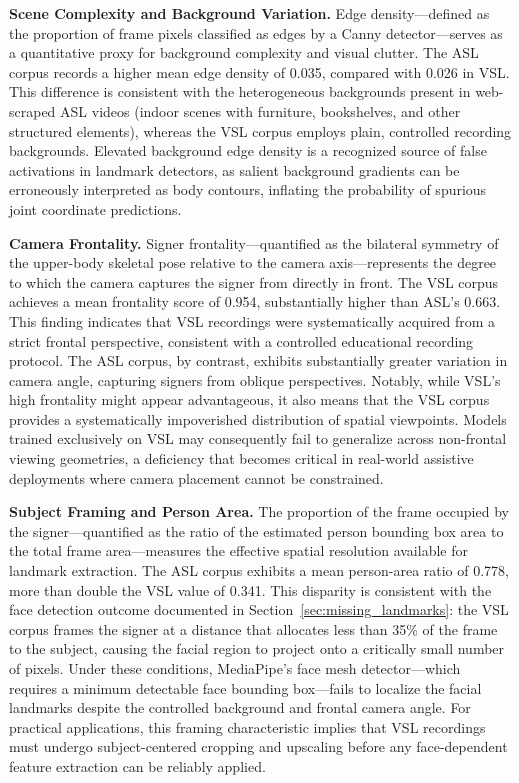 \documentclass{ieeeaccess}
\begin{document}
\textbf{Scene Complexity and Background Variation.} Edge density—defined as the proportion of frame pixels classified as edges by a Canny detector—serves as a quantitative proxy for background complexity and visual clutter. The ASL corpus records a higher mean edge density of 0.035, compared with 0.026 in VSL. This difference is consistent with the heterogeneous backgrounds present in web-scraped ASL videos (indoor scenes with furniture, bookshelves, and other structured elements), whereas the VSL corpus employs plain, controlled recording backgrounds. Elevated background edge density is a recognized source of false activations in landmark detectors, as salient background gradients can be erroneously interpreted as body contours, inflating the probability of spurious joint coordinate predictions.

\textbf{Camera Frontality.} Signer frontality—quantified as the bilateral symmetry of the upper-body skeletal pose relative to the camera axis—represents the degree to which the camera captures the signer from directly in front. The VSL corpus achieves a mean frontality score of 0.954, substantially higher than ASL's 0.663. This finding indicates that VSL recordings were systematically acquired from a strict frontal perspective, consistent with a controlled educational recording protocol. The ASL corpus, by contrast, exhibits substantially greater variation in camera angle, capturing signers from oblique perspectives. Notably, while VSL's high frontality might appear advantageous, it also means that the VSL corpus provides a systematically impoverished distribution of spatial viewpoints. Models trained exclusively on VSL may consequently fail to generalize across non-frontal viewing geometries, a deficiency that becomes critical in real-world assistive deployments where camera placement cannot be constrained.

\textbf{Subject Framing and Person Area.} The proportion of the frame occupied by the signer—quantified as the ratio of the estimated person bounding box area to the total frame area—measures the effective spatial resolution available for landmark extraction. The ASL corpus exhibits a mean person-area ratio of 0.778, more than double the VSL value of 0.341. This disparity is consistent with the face detection outcome documented in Section~\ref{sec:missing_landmarks}: the VSL corpus frames the signer at a distance that allocates less than 35\% of the frame to the subject, causing the facial region to project onto a critically small number of pixels. Under these conditions, MediaPipe's face mesh detector—which requires a minimum detectable face bounding box—fails to localize the facial landmarks despite the controlled background and frontal camera angle. For practical applications, this framing characteristic implies that VSL recordings must undergo subject-centered cropping and upscaling before any face-dependent feature extraction can be reliably applied.
\end{document}

